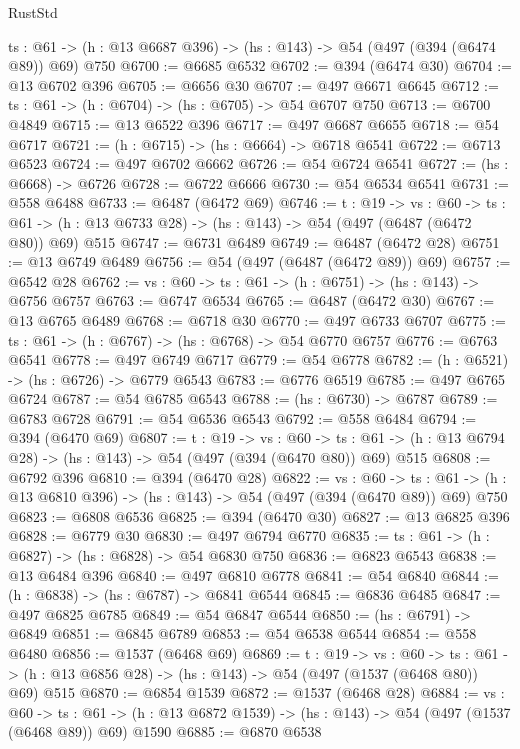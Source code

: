\begin{lexlean}{RustStd}
\begin{coremodule}
  {ts : @61} -> (h : @13 @6687 @396) -> (hs : @143) -> @54 (@497 (@394 (@6474 @89)) @69) @750
@6700 := @6685 @6532
@6702 := @394 (@6474 @30)
@6704 := @13 @6702 @396
@6705 := @6656 @30
@6707 := @497 @6671 @6645
@6712 := {ts : @61} -> (h : @6704) -> (hs : @6705) -> @54 @6707 @750
@6713 := @6700 @4849
@6715 := @13 @6522 @396
@6717 := @497 @6687 @6655
@6718 := @54 @6717
@6721 := (h : @6715) -> (hs : @6664) -> @6718 @6541
@6722 := @6713 @6523
@6724 := @497 @6702 @6662
@6726 := @54 @6724 @6541
@6727 := (hs : @6668) -> @6726
@6728 := @6722 @6666
@6730 := @54 @6534 @6541
@6731 := @558 @6488
@6733 := @6487 (@6472 @69)
@6746 := {t : @19} ->
  {vs : @60} ->
  {ts : @61} -> (h : @13 @6733 @28) -> (hs : @143) -> @54 (@497 (@6487 (@6472 @80)) @69) @515
@6747 := @6731 @6489
@6749 := @6487 (@6472 @28)
@6751 := @13 @6749 @6489
@6756 := @54 (@497 (@6487 (@6472 @89)) @69)
@6757 := @6542 @28
@6762 := {vs : @60} -> {ts : @61} -> (h : @6751) -> (hs : @143) -> @6756 @6757
@6763 := @6747 @6534
@6765 := @6487 (@6472 @30)
@6767 := @13 @6765 @6489
@6768 := @6718 @30
@6770 := @497 @6733 @6707
@6775 := {ts : @61} -> (h : @6767) -> (hs : @6768) -> @54 @6770 @6757
@6776 := @6763 @6541
@6778 := @497 @6749 @6717
@6779 := @54 @6778
@6782 := (h : @6521) -> (hs : @6726) -> @6779 @6543
@6783 := @6776 @6519
@6785 := @497 @6765 @6724
@6787 := @54 @6785 @6543
@6788 := (hs : @6730) -> @6787
@6789 := @6783 @6728
@6791 := @54 @6536 @6543
@6792 := @558 @6484
@6794 := @394 (@6470 @69)
@6807 := {t : @19} ->
  {vs : @60} ->
  {ts : @61} -> (h : @13 @6794 @28) -> (hs : @143) -> @54 (@497 (@394 (@6470 @80)) @69) @515
@6808 := @6792 @396
@6810 := @394 (@6470 @28)
@6822 := {vs : @60} ->
  {ts : @61} -> (h : @13 @6810 @396) -> (hs : @143) -> @54 (@497 (@394 (@6470 @89)) @69) @750
@6823 := @6808 @6536
@6825 := @394 (@6470 @30)
@6827 := @13 @6825 @396
@6828 := @6779 @30
@6830 := @497 @6794 @6770
@6835 := {ts : @61} -> (h : @6827) -> (hs : @6828) -> @54 @6830 @750
@6836 := @6823 @6543
@6838 := @13 @6484 @396
@6840 := @497 @6810 @6778
@6841 := @54 @6840
@6844 := (h : @6838) -> (hs : @6787) -> @6841 @6544
@6845 := @6836 @6485
@6847 := @497 @6825 @6785
@6849 := @54 @6847 @6544
@6850 := (hs : @6791) -> @6849
@6851 := @6845 @6789
@6853 := @54 @6538 @6544
@6854 := @558 @6480
@6856 := @1537 (@6468 @69)
@6869 := {t : @19} ->
  {vs : @60} ->
  {ts : @61} -> (h : @13 @6856 @28) -> (hs : @143) -> @54 (@497 (@1537 (@6468 @80)) @69) @515
@6870 := @6854 @1539
@6872 := @1537 (@6468 @28)
@6884 := {vs : @60} ->
  {ts : @61} -> (h : @13 @6872 @1539) -> (hs : @143) -> @54 (@497 (@1537 (@6468 @89)) @69) @1590
@6885 := @6870 @6538

\end{coremodule}
\end{lexlean}
